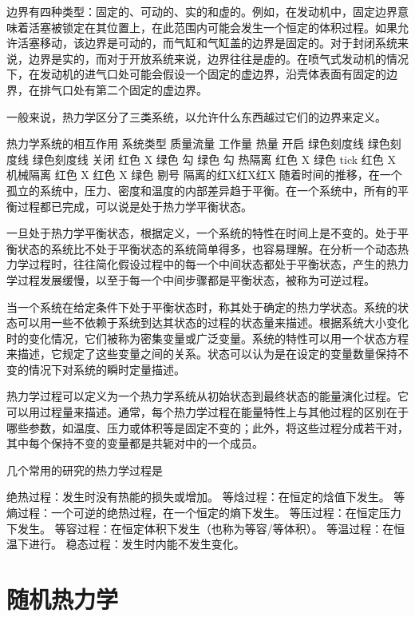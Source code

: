 边界有四种类型：固定的、可动的、实的和虚的。例如，在发动机中，固定边界意味着活塞被锁定在其位置上，在此范围内可能会发生一个恒定的体积过程。如果允许活塞移动，该边界是可动的，而气缸和气缸盖的边界是固定的。对于封闭系统来说，边界是实的，而对于开放系统来说，边界往往是虚的。在喷气式发动机的情况下，在发动机的进气口处可能会假设一个固定的虚边界，沿壳体表面有固定的边界，在排气口处有第二个固定的虚边界。

一般来说，热力学区分了三类系统，以允许什么东西越过它们的边界来定义。

热力学系统的相互作用
系统类型 质量流量 工作量 热量
开启 绿色刻度线 绿色刻度线 绿色刻度线
关闭 红色 X 绿色 勾 绿色 勾
热隔离 红色 X 绿色 tick 红色 X
机械隔离 红色 X 红色 X 绿色 剔号
隔离的红X红X红X
随着时间的推移，在一个孤立的系统中，压力、密度和温度的内部差异趋于平衡。在一个系统中，所有的平衡过程都已完成，可以说是处于热力学平衡状态。

一旦处于热力学平衡状态，根据定义，一个系统的特性在时间上是不变的。处于平衡状态的系统比不处于平衡状态的系统简单得多，也容易理解。在分析一个动态热力学过程时，往往简化假设过程中的每一个中间状态都处于平衡状态，产生的热力学过程发展缓慢，以至于每一个中间步骤都是平衡状态，被称为可逆过程。

当一个系统在给定条件下处于平衡状态时，称其处于确定的热力学状态。系统的状态可以用一些不依赖于系统到达其状态的过程的状态量来描述。根据系统大小变化时的变化情况，它们被称为密集变量或广泛变量。系统的特性可以用一个状态方程来描述，它规定了这些变量之间的关系。状态可以认为是在设定的变量数量保持不变的情况下对系统的瞬时定量描述。

热力学过程可以定义为一个热力学系统从初始状态到最终状态的能量演化过程。它可以用过程量来描述。通常，每个热力学过程在能量特性上与其他过程的区别在于哪些参数，如温度、压力或体积等是固定不变的；此外，将这些过程分成若干对，其中每个保持不变的变量都是共轭对中的一个成员。

几个常用的研究的热力学过程是

绝热过程：发生时没有热能的损失或增加。
等焓过程：在恒定的焓值下发生。
等熵过程：一个可逆的绝热过程，在一个恒定的熵下发生。
等压过程：在恒定压力下发生。
等容过程：在恒定体积下发生（也称为等容/等体积）。
等温过程：在恒温下进行。
稳态过程：发生时内能不发生变化。
\section{随机热力学}

